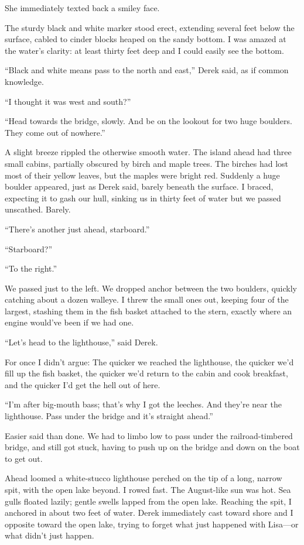 She immediately texted back a smiley face.

The sturdy black and white marker stood erect, extending several feet
below the surface, cabled to cinder blocks heaped on the sandy bottom. I
was amazed at the water's clarity: at least thirty feet deep and I could
easily see the bottom.

``Black and white means pass to the north and east,'' Derek said, as if
common knowledge.

``I thought it was west and south?''

``Head towards the bridge, slowly. And be on the lookout for two huge
boulders. They come out of nowhere.''

A slight breeze rippled the otherwise smooth water. The island ahead had
three small cabins, partially obscured by birch and maple trees. The
birches had lost most of their yellow leaves, but the maples were bright
red. Suddenly a huge boulder appeared, just as Derek said, barely
beneath the surface. I braced, expecting it to gash our hull, sinking us
in thirty feet of water but we passed unscathed. Barely.

``There's another just ahead, starboard.''

``Starboard?''

``To the right.''

We passed just to the left. We dropped anchor between the two boulders,
quickly catching about a dozen walleye. I threw the small ones out,
keeping four of the largest, stashing them in the fish basket attached
to the stern, exactly where an engine would've been if we had one.

``Let's head to the lighthouse,'' said Derek.

For once I didn't argue: The quicker we reached the lighthouse, the
quicker we'd fill up the fish basket, the quicker we'd return to the
cabin and cook breakfast, and the quicker I'd get the hell out of here.

``I'm after big-mouth bass; that's why I got the leeches. And they're
near the lighthouse. Pass under the bridge and it's straight ahead.''

Easier said than done. We had to limbo low to pass under the
railroad-timbered bridge, and still got stuck, having to push up on the
bridge and down on the boat to get out.

Ahead loomed a white-stucco lighthouse perched on the tip of a long,
narrow spit, with the open lake beyond. I rowed fast. The August-like
sun was hot. Sea gulls floated lazily; gentle swells lapped from the
open lake. Reaching the spit, I anchored in about two feet of water.
Derek immediately cast toward shore and I opposite toward the open lake,
trying to forget what just happened with Lisa---or what didn't just
happen.

